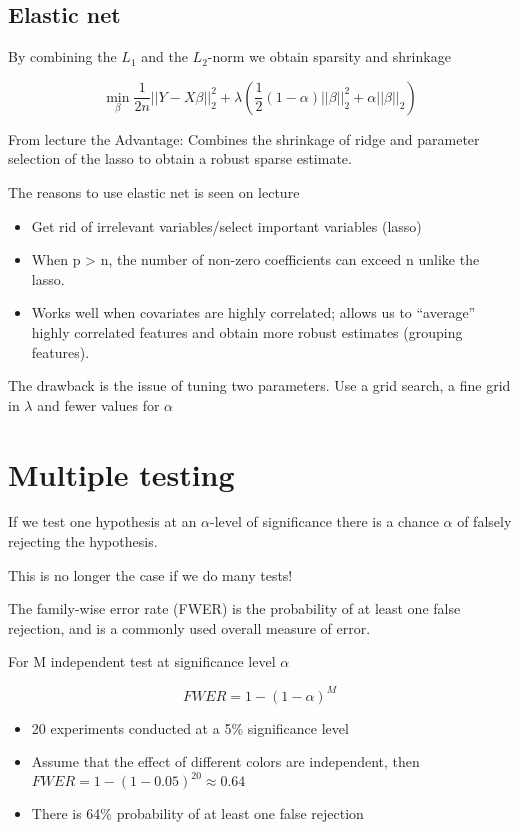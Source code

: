 \subsection{Elastic net}

By combining the $L_1$ and the $L_2$-norm we obtain sparsity and shrinkage

\[
    \min\limits_\beta \frac{1}{2n} || Y - X \beta ||^2_2 + \lambda \left( \frac{1}{2} (1 - \alpha) ||\beta ||^2_2 + \alpha ||\beta||_2 \right)
\]

From lecture \cite[p.39]{lecture3} the Advantage: Combines the shrinkage of ridge and parameter selection of the lasso to obtain a robust sparse estimate.

The reasons to use elastic net is seen on lecture \cite[p.~49]{lecture3}

\begin{itemize}
  \item Get rid of irrelevant variables/select important variables (lasso)
  \item When p > n, the number of non-zero coefficients can exceed n unlike the lasso.
  \item Works well when covariates are highly correlated; allows us to “average” highly correlated features and obtain more robust estimates (grouping features).
\end{itemize}

The drawback is the issue of tuning two parameters. Use a grid search, a fine grid in $\lambda$ and fewer values for $\alpha$


\section{Multiple testing}

If we test one hypothesis at an $\alpha$-level of significance there is a chance $\alpha$ of falsely rejecting the hypothesis. \cite[p.52-53]{lecture3}

This is no longer the case if we do many tests!

The family-wise error rate (FWER) is the probability of at least one false rejection, and is a commonly used overall measure of error. \cite[p.~686]{friedman2016elements}

For M independent test at significance level $\alpha$

\[
    FWER = 1 - (1 - \alpha)^M
\]

\begin{itemize}
  \item 20 experiments conducted at a 5\% significance level
  \item Assume that the effect of different colors are independent, then $FWER = 1 - (1 - 0.05)^{20} \approx 0.64$
  \item There is 64\% probability of at least one false rejection
\end{itemize}

